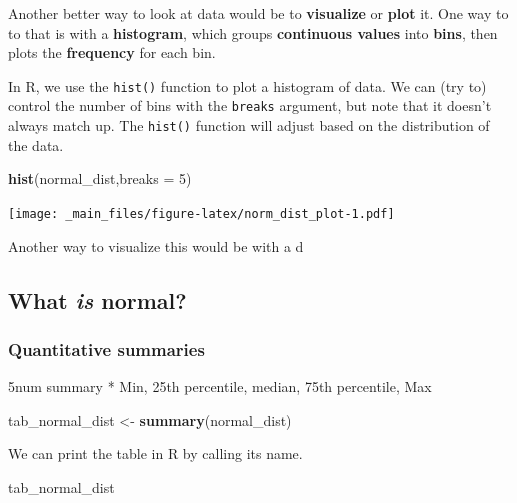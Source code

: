\documentclass[
]{book}
\newenvironment{Shaded}{\begin{snugshade}}{\end{snugshade}}
\newcommand{\DataTypeTok}[1]{\textcolor[rgb]{0.13,0.29,0.53}{#1}}
\newcommand{\DecValTok}[1]{\textcolor[rgb]{0.00,0.00,0.81}{#1}}
\newcommand{\KeywordTok}[1]{\textcolor[rgb]{0.13,0.29,0.53}{\textbf{#1}}}
\newcommand{\NormalTok}[1]{#1}
\newcommand{\StringTok}[1]{\textcolor[rgb]{0.31,0.60,0.02}{#1}}
\begin{document}
Another better way to look at data would be to \textbf{visualize} or \textbf{plot} it. One way to to that is with a \textbf{histogram}, which groups \textbf{continuous values} into \textbf{bins}, then plots the \textbf{frequency} for each bin.

In R, we use the \texttt{hist()} function to plot a histogram of data. We can (try to) control the number of bins with the \texttt{breaks} argument, but note that it doesn't always match up. The \texttt{hist()} function will adjust based on the distribution of the data.

\begin{Shaded}
\begin{Highlighting}[]
\KeywordTok{hist}\NormalTok{(normal_dist,}\DataTypeTok{breaks =} \DecValTok{5}\NormalTok{)}
\end{Highlighting}
\end{Shaded}

\texttt{[image: \_main\_files/figure-latex/norm\_dist\_plot-1.pdf]}

Another way to visualize this would be with a d

\hypertarget{what-is-normal}{%
\subsection{\texorpdfstring{What \emph{is} normal?}{What is normal?}}\label{what-is-normal}}

\hypertarget{quantitative-summaries}{%
\subsubsection{Quantitative summaries}\label{quantitative-summaries}}

5num summary
* Min, 25th percentile, median, 75th percentile, Max

\begin{Shaded}
\begin{Highlighting}[]
\NormalTok{tab_normal_dist <-}\StringTok{ }\KeywordTok{summary}\NormalTok{(normal_dist)}
\end{Highlighting}
\end{Shaded}

We can print the table in R by calling its name.

\begin{Shaded}
\begin{Highlighting}[]
\NormalTok{tab_normal_dist}
\end{Highlighting}
\end{Shaded}
\end{document}

